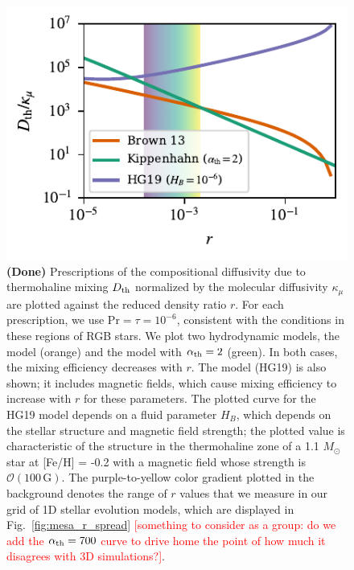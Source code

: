 \begin{figure}
    \centering
    \includegraphics[width=\columnwidth]{Nu_models_comparison.pdf}
    \caption{ {\bf{(Done)}}
    Prescriptions of the compositional diffusivity due to thermohaline mixing $D_{\rm th}$ normalized by the molecular diffusivity $\kappa_{\mu}$ are plotted against the reduced density ratio $r$. For each prescription, we use $\mathrm{Pr} = \tau = 10^{-6}$, consistent with the conditions in these regions of RGB stars.
    We plot two hydrodynamic models, the \citet{brown_etal_2013} model (orange) and the \citet{kippenhahn_etal_1980} model with $\alpha_{\rm th} = 2$ (green). In both cases, the mixing efficiency decreases with $r$.
    The \citet{harrington} model (HG19) is also shown; it includes magnetic fields, which cause mixing efficiency to increase with $r$ for these parameters.
    The plotted curve for the HG19 model depends on a fluid parameter $H_B$, which depends on the stellar structure and magnetic field strength; the plotted value is characteristic of the structure in the thermohaline zone of a 1.1 $M_\odot$ star at [Fe/H] = -0.2 with a magnetic field whose strength is $\mathcal{O}(100 \,\mathrm{G})$.
    The purple-to-yellow color gradient plotted in the background denotes the range of $r$ values that we measure in our grid of 1D stellar evolution models, which are displayed in Fig.~\ref{fig:mesa_r_spread} \textcolor{red}{[something to consider as a group: do we add the $\alpha_{\rm{th}} = 700$ curve to drive home the point of how much it disagrees with 3D simulations?]}.
    }
    \label{fig:parameterization_compare}
\end{figure}
